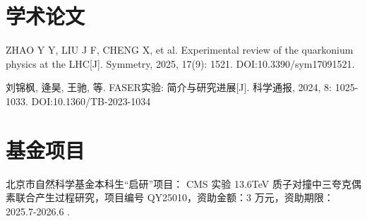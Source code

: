 
\begin{resume}
  \section*{学术论文}

  \begin{achievements}
    \item ZHAO Y Y, LIU J F, CHENG X, et al. Experimental review of the quarkonium physics at the LHC[J]. Symmetry, 2025, 17(9): 1521. DOI:10.3390/sym17091521.
    \item 刘锦枫, 逄昊, 王驰, 等. FASER实验: 简介与研究进展[J]. 科学通报, 2024, 8: 1025-1033. DOI:10.1360/TB-2023-1034



  \end{achievements}


  \section*{基金项目}

  \begin{achievements}
    \item 北京市自然科学基金本科生“启研”项目： CMS 实验 13.6TeV 质子对撞中三夸克偶素联合产生过程研究，项目编号 QY25010，资助金额：3 万元，资助期限：2025.7-2026.6 .

  \end{achievements}
\end{resume}
